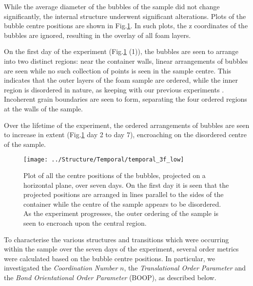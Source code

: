 \documentclass[10pt,a4paper]{article}
\begin{document}

While the average diameter of the bubbles of the sample did not change significantly, the internal structure underwent significant alterations. Plots of the bubble centre positions are shown in Fig.\ref{fig:xy_centers}. In such plots, the z coordinates of the bubbles are ignored, resulting in the overlay of all foam layers. 

On the first day of the experiment (Fig.\ref{fig:xy_centers} (1)), the bubbles are seen to arrange into two distinct regions: near the container walls, linear arrangements of bubbles are seen while no such collection of points is seen in the sample centre. This indicates that the outer layers of the foam sample are ordered, while the inner region is disordered in nature, as keeping with our previous experiments \cite{Meagher2011}.
Incoherent grain boundaries are seen to form, separating the four ordered regions at the walls of the sample.

 
Over the lifetime of the experiment, the ordered arrangements of bubbles are seen to increase in extent (Fig.\ref{fig:xy_centers} day 2 to day 7), encroaching on the disordered centre of the sample. 

\begin{figure}[H]
\centering
\texttt{[image: ../Structure/Temporal/temporal\_3f\_low]}
\caption{Plot of all the centre positions of the bubbles, projected on a horizontal plane, over seven days. On the first day it is seen that the projected positions are arranged in lines parallel to the sides of the container while the centre of the sample appears to be disordered. As the experiment progresses, the outer ordering of the sample is seen to encroach upon the central region.}
\label{fig:xy_centers}
\end{figure}

To characterise the various structures and transitions which were occurring within the sample over the seven days of the experiment, several order metrics were calculated based on the bubble centre positions. In particular, we investigated the \emph{Coordination Number} $n$, the \emph{Translational Order Parameter} and the \emph{Bond Orientational Order Parameter} (BOOP), as described below.
\end{document}
